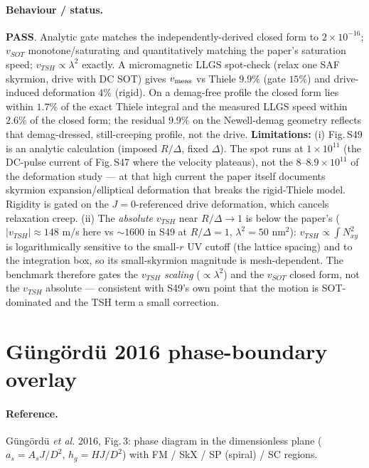 \documentclass[11pt]{article}
\newcommand{\PASS}{\textcolor{green!55!black}{\textbf{PASS}}}
\begin{document}
\paragraph{Behaviour / status.} \PASS. Analytic gate matches the
independently-derived closed form to $2\times10^{-16}$;
$v_{SOT}$ monotone/saturating and quantitatively matching the
paper's saturation speed; $v_{TSH}\propto\lambda^2$ exactly.
A micromagnetic LLGS spot-check (relax one SAF skyrmion, drive with
DC SOT) gives $v_{\rm meas}$ vs Thiele $9.9\%$ (gate $15\%$) and
drive-induced deformation $4\%$ (rigid). On a demag-free profile
the closed form lies within $1.7\%$ of the exact Thiele integral
and the measured LLGS speed within $2.6\%$ of the closed form; the
residual $9.9\%$ on the Newell-demag geometry reflects that
demag-dressed, still-creeping profile, not the drive. \textbf{Limitations:} (i) Fig.\,S49 is an
analytic calculation (imposed $R/\Delta$, fixed $\Delta$). The spot
runs at $1\times10^{11}$ (the DC-pulse current of Fig.\,S47 where
the velocity plateaus), not the $8$--$8.9\times10^{11}$ of the
deformation study --- at that high current the paper itself
documents skyrmion expansion/elliptical deformation that breaks the
rigid-Thiele model. Rigidity is gated on the $J{=}0$-referenced
drive deformation, which cancels relaxation creep.
(ii) The \emph{absolute} $v_{TSH}$ near $R/\Delta\!\to\!1$ is below
the paper's ($|v_{TSH}|\!\approx\!148$ m/s here vs ${\sim}1600$ in
S49 at $R/\Delta{=}1$, $\lambda^2{=}50$ nm$^2$): $v_{TSH}\propto
\int N_{xy}^2$ is logarithmically sensitive to the small-$r$ UV
cutoff (the lattice spacing) and to the integration box, so its
small-skyrmion magnitude is mesh-dependent. The benchmark therefore
gates the $v_{TSH}$ \emph{scaling} ($\propto\lambda^2$) and the
$v_{SOT}$ closed form, not the $v_{TSH}$ absolute --- consistent
with S49's own point that the motion is SOT-dominated and the TSH
term a small correction.

\clearpage
\section{G\"ung\"ord\"u 2016 phase-boundary overlay}
\label{sec:gungordu}

\paragraph{Reference.} G\"ung\"ord\"u \emph{et al.} 2016, Fig.\,3:
phase diagram in the dimensionless plane
($a_s=A_sJ/D^2$, $h_g=HJ/D^2$) with FM / SkX / SP (spiral) / SC
regions.
\end{document}

